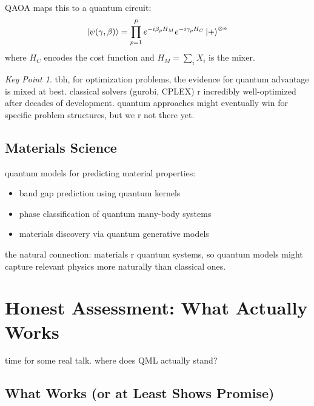 \documentclass[11pt,a4paper]{article}
\theoremstyle{definition}
\theoremstyle{remark}
\newtheorem*{keypoint}{Key Point}
\begin{document}
QAOA maps this to a quantum circuit:
\begin{equation}
    \ket{\psi(\gamma, \beta)} = \prod_{p=1}^{P} e^{-i\beta_p H_M} e^{-i\gamma_p H_C} \ket{+}^{\otimes n}
\end{equation}
where $H_C$ encodes the cost function and $H_M = \sum_i X_i$ is the mixer.

\begin{keypoint}
tbh, for optimization problems, the evidence for quantum advantage is mixed at best. classical solvers (gurobi, CPLEX) r incredibly well-optimized after decades of development. quantum approaches might eventually win for specific problem structures, but we r not there yet.
\end{keypoint}

\subsection{Materials Science}

quantum models for predicting material properties:
\begin{itemize}
    \item band gap prediction using quantum kernels
    \item phase classification of quantum many-body systems
    \item materials discovery via quantum generative models
\end{itemize}

the natural connection: materials r quantum systems, so quantum models might capture relevant physics more naturally than classical ones.

\section{Honest Assessment: What Actually Works}

time for some real talk. where does QML actually stand?

\subsection{What Works (or at Least Shows Promise)}
\end{document}
